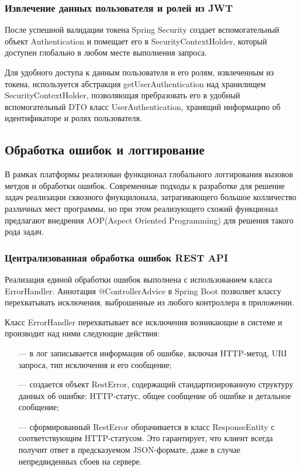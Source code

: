 \subsubsection{Извлечение данных пользователя и ролей из JWT}

После успешной валидации токена Spring Security создает вспомогательный объект Authentication и помещает его в SecurityContextHolder, который доступен глобально в любом месте выполнения запроса.

Для удобного доступа к данным пользователя и его ролям, извлеченным из токена, используется абстракция getUserAuthentication над хранилищем SecurityContextHolder, позволяющая пребразовать его в удобный вспомогательный DTO класс UserAuthentication, хранящий информацию об идентификаторе и ролях пользователя.

\subsection{Обработка ошибок и логгирование}

В рамках платформы реализован функционал глобального логгирования вызовов метдов и обработки ошибок. 
Современные подходы к разработке для решение задач реализации сквозного фнукцилонала, затрагивающего большое колличество различных мест программы, но при этом реализующего схожий функционал предлагают внедрения AOP(Aspect Oriented Programming)\cite{kiczales1997aspect} для решения такого рода задач. 

\subsubsection{Централизованная обработка ошибок REST API}

Реализация единой обработки ошибок выполнена с использованием класса ErrorHandler. Аннотация @ControllerAdvice в Spring Boot позволяет классу перехватывать исключения, выброшенные из любого контроллера в приложении.

Класс ErrorHandler перехватывает все исключения возникающие в системе и производит над ними следующие действия:

\begin{itemize}
  \item[---]в лог записывается информация об ошибке, включая HTTP-метод, URI запроса, тип исключения и его сообщение;
  \item[---]создается объект RestError, содержащий стандартизированную структуру данных об ошибке: HTTP-статус, общее сообщение об ошибке и детальное сообщение;
  \item[---]сформированный RestError оборачивается в класс ResponseEntity с соответствующим HTTP-статусом. Это гарантирует, что клиент всегда получит ответ в предсказуемом JSON-формате, даже в случае непредвиденных сбоев на сервере.
\end{itemize}

